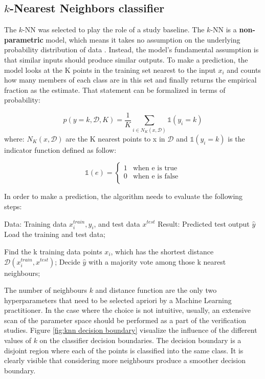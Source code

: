 \subsection{$k$-Nearest Neighbors classifier}
The $k$-NN was selected to play the role of a study baseline. The $k$-NN  is a \textbf{non-parametric} model, which means it takes no assumption on the underlying probability distribution of data \cite{knn}. 
Instead, the model's fundamental assumption is that similar inputs should produce similar outputs. To make a prediction, the model looks at the K points in the training set nearest to the input $x_i$ and counts how many members of each class are in this set and finally returns the empirical fraction as the estimate. That statement can be formalized in terms of probability:  

\begin{equation}
p(y=k,\mathcal{D}, K) = \frac{1}{K} \sum_{i\in N_K(x,\mathcal{D})} \mathds{1}(y_i=k)
\end{equation}
where: 
$N_K(x,\mathcal{D})$ are the K nearest points to x in $\mathcal{D}$ and $\mathds{1}(y_i=k)$ is the indicator function defined as follow: 

\begin{equation}
    \mathds{1}(e) = \left\{ \begin{array}{ll}
1 & \textrm{when e is true}\\
0 & \textrm{when e is false}\\
\end{array} \right.
\end{equation}

In order to make a prediction, the algorithm needs to evaluate the following steps: 
\begin{algorithm}[caption={k-nearest neighbour, $k$-NN }, label={knn}]
Data: Training data ${x^{train}_{i} , y_{i}}$, and test data ${x^{test}}$
Result: Predicted test output $\hat{y}$
Load the training and test data;

Find the k training data points $x_i$, which has the shortest distance$\mathcal{D}(x^{train}_i, x^{test})$;
Decide $\hat{y}$ with a majority vote among those k nearest neighbours;  
\end{algorithm}

The number of neighbours $k$ and distance function are the only two hyperparameters that need to be selected apriori by a Machine Learning practitioner. In the case where the choice is not intuitive, usually, an extensive scan of the parameter space should be performed as a part of the verification studies. Figure \ref{fig:knn decision boundary} visualize the influence of the different values of $k$ on the classifier decision boundaries. The decision boundary is a disjoint region where each of the points is classified into the same class. It is clearly visible that considering more neighbours produce a smoother decision boundary. 

